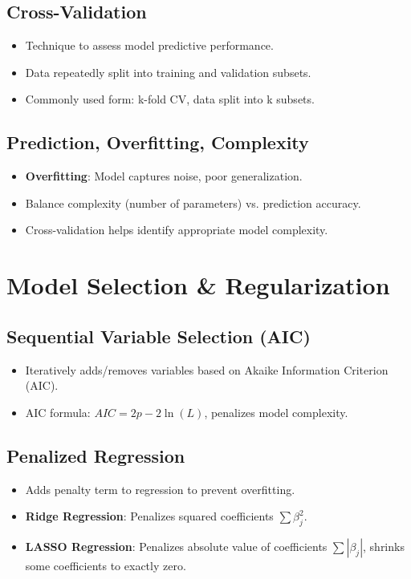 \documentclass[10pt, landscape]{article}
\begin{document}
\begin{multicols}{3}
\subsection{Cross-Validation}
\begin{itemize}[noitemsep]
    \item Technique to assess model predictive performance.
    \item Data repeatedly split into training and validation subsets.
    \item Commonly used form: k-fold CV, data split into k subsets.
\end{itemize}

\subsection{Prediction, Overfitting, Complexity}
\begin{itemize}[noitemsep]
    \item \textbf{Overfitting}: Model captures noise, poor generalization.
    \item Balance complexity (number of parameters) vs. prediction accuracy.
    \item Cross-validation helps identify appropriate model complexity.
\end{itemize}

\section{Model Selection \& Regularization}

\subsection{Sequential Variable Selection (AIC)}
\begin{itemize}[noitemsep]
    \item Iteratively adds/removes variables based on Akaike Information Criterion (AIC).
    \item AIC formula: \( AIC = 2p - 2\ln(L) \), penalizes model complexity.
\end{itemize}

\subsection{Penalized Regression}
\begin{itemize}[noitemsep]
    \item Adds penalty term to regression to prevent overfitting.
    \item \textbf{Ridge Regression}: Penalizes squared coefficients \(\sum \beta_j^2\).
    \item \textbf{LASSO Regression}: Penalizes absolute value of coefficients \(\sum |\beta_j|\), shrinks some coefficients to exactly zero.
\end{itemize}


\end{multicols}
\end{document}

